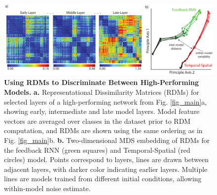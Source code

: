 \begin{figure}
\includegraphics [width=1\linewidth]{figures/rdms.pdf}
\vspace{-5mm}
\caption{\footnotesize{\textbf{Using RDMs to Discriminate Between High-Performing Models.} \textbf{a.} Representational Dissimilarity Matrices (RDMs) for selected layers of a high-performing network from Fig. \ref{fig_main}a, showing early, intermediate and late model layers.  Model feature vectors are averaged over classes in the dataset prior to RDM computation, and RDMs are shown using the same ordering as in Fig. \ref{fig_main}b. \textbf{b.} Two-dimensional MDS embedding of RDMs for the feedback RNN (green squares) and Temporal-Spatial (red circles) model.  Points correspond to layers, lines are drawn between adjacent layers, with darker color indicating earlier layers.  Multiple lines are models trained from different initial conditions, allowing within-model noise estimate.}~\label{fig_rdms}}
\vspace{-5mm}
\end{figure}


